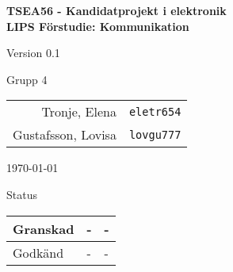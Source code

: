 \documentclass[11pt]{article}
\begin{document}
 
\begin{titlepage}
\begin{center}

{\Large\bfseries TSEA56 - Kandidatprojekt i elektronik \\ LIPS Förstudie: Kommunikation}

\vspace{5em}

Version 0.1

\vspace{5em}
Grupp 4 \\
\begin{tabular}{rl}
Tronje, Elena&\verb+eletr654+
\\
Gustafsson, Lovisa&\verb+lovgu777+
\\
\end{tabular}

\vspace{5em}
\today

\vspace{16em}
Status
\begin{longtable}{|l|l|l|} \hline

Granskad & - & - \\ \hline
Godkänd & - & - \\ \hline
 
\end{longtable}

\end{center}
\end{titlepage}
\end{document}
